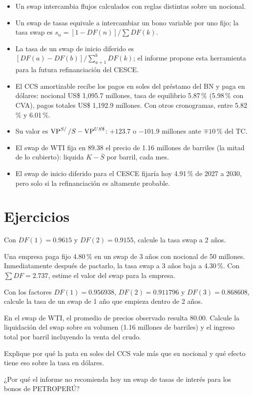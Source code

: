 \begin{resumen}
\begin{itemize}
\item Un swap intercambia flujos calculados con reglas distintas sobre un nocional.
\item Un swap de tasas equivale a intercambiar un bono variable por uno fijo; la tasa swap es $s_n=[1-DF(n)]/\sum DF(k)$.
\item La tasa de un swap de inicio diferido es $[DF(a)-DF(b)]/\sum_{a+1}^{b}DF(k)$; el informe propone esta herramienta para la futura refinanciación del CESCE.
\item El CCS amortizable recibe los pagos en soles del préstamo del BN y paga en dólares: nocional US\$ 1,095.7 millones, tasa de equilibrio 5.87\,\% (5.98\,\% con CVA), pagos totales US\$ 1,192.9 millones. Con otros cronogramas, entre 5.82\,\% y 6.01\,\%.
\item Su valor es $\operatorname{VP}^{S/}/S-\operatorname{VP}^{US\$}$: $+123.7$ o $-101.9$ millones ante $\mp10\,\%$ del TC.
\item El swap de WTI fija en 89.38 el precio de 1.16 millones de barriles (la mitad de lo cubierto): liquida $K-\bar S$ por barril, cada mes.
\item El swap de inicio diferido para el CESCE fijaría hoy 4.91\,\% de 2027 a 2030, pero solo si la refinanciación es altamente probable.
\end{itemize}
\end{resumen}

\section*{Ejercicios}

\ejercicio[cálculo] Con $DF(1)=0.9615$ y $DF(2)=0.9155$, calcule la tasa swap a 2 años.

\ejercicio[cálculo] Una empresa paga fijo 4.80\,\% en un swap de 3 años con nocional de 50 millones. Inmediatamente después de pactarlo, la tasa swap a 3 años baja a 4.30\,\%. Con $\sum DF=2.737$, estime el valor del swap para la empresa.

\ejercicio[cálculo] Con los factores $DF(1)=0.956938$, $DF(2)=0.911796$ y $DF(3)=0.868608$, calcule la tasa de un swap de 1 año que empieza dentro de 2 años.

\ejercicio[cálculo] En el swap de WTI, el promedio de precios observado resulta 80.00. Calcule la liquidación del swap sobre su volumen (1.16 millones de barriles) y el ingreso total por barril incluyendo la venta del crudo.

\ejercicio[conceptual] Explique por qué la pata en soles del CCS vale más que su nocional y qué efecto tiene eso sobre la tasa en dólares.

\ejercicio[conceptual] ¿Por qué el informe no recomienda hoy un swap de tasas de interés para los bonos de PETROPERÚ?
